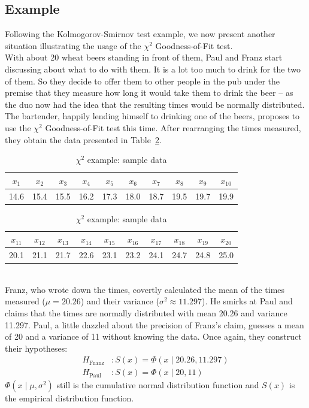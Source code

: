 \documentclass{article}
\theoremstyle{definition}
\newcommand{\reftbl}[1]{Table~\ref{#1}}
\begin{document}
\subsection{Example}
Following the Kolmogorov-Smirnov test example, we now present another situation illustrating the usage of the $\chi^2$ Goodness-of-Fit test.
\\
With about 20 wheat beers standing in front of them, Paul and Franz start discussing about what to do with them.
It is a lot too much to drink for the two of them.
So they decide to offer them to other people in the pub under the premise that they measure how long it would take them to drink the beer -- as the duo now had the idea that the resulting times would be normally distributed.
The bartender, happily lending himself to drinking one of the beers, proposes to use the $\chi^2$ Goodness-of-Fit test this time.
After rearranging the times measured, they obtain the data presented in \reftbl{tbl:chisqrawdata}.
%
\begin{table}[htb]
\caption{$\chi^2$ example: sample data}
\label{tbl:chisqrawdata}
\center
\begin{tabular}{cccccccccc}
$x_1$	&$x_2$	&$x_3$	&$x_4$	&$x_5$	&$x_6$	&$x_7$	&$x_8$	&$x_9$	&$x_{10}$\\
\hline
14.6	&15.4	&15.5	&16.2	&17.3	&18.0	&18.7	&19.5	&19.7	&19.9	\\
\end{tabular}
\begin{tabular}{cccccccccc}
$x_{11}$	&$x_{12}$	&$x_{13}$	&$x_{14}$	&$x_{15}$	&$x_{16}$	&$x_{17}$	&$x_{18}$	&$x_{19}$	&$x_{20}$\\
\hline
20.1	&21.1	&21.7	&22.6	&23.1	&23.2	&24.1	&24.7	&24.8	&25.0	\\
\end{tabular}
\end{table}
\\
Franz, who wrote down the times, covertly calculated the mean of the times measured ($\mu = 20.26$) and their variance ($\sigma^2 \approx 11.297$).
He smirks at Paul and claims that the times are normally distributed with mean 20.26 and variance 11.297.
Paul, a little dazzled about the precision of Franz's claim, guesses a mean of 20 and a variance of 11 without knowing the data.
Once again, they construct their hypotheses:
\begin{align*}
	H_{\text{Franz}} &: S(x) = \Phi(x\mid 20.26, 11.297)
	\\
	H_{\text{Paul}} &: S(x) = \Phi(x\mid 20, 11)
\end{align*}
$\Phi(x\mid\mu,\sigma^2)$ still is the cumulative normal distribution function and $S(x)$ is the empirical distribution function.
\end{document}
